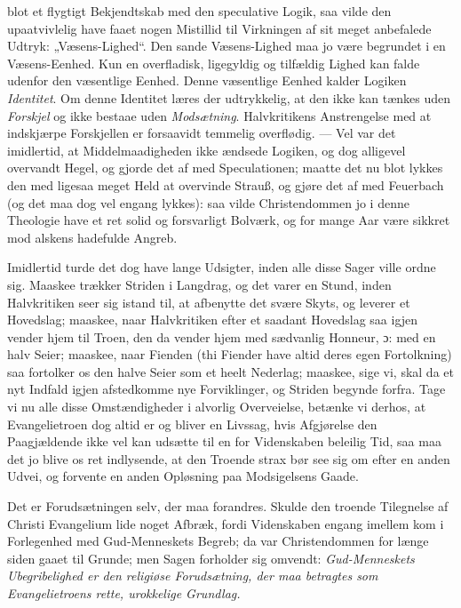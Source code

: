 \documentclass[12pt,a4paper]{book}
\begin{document}
blot et flygtigt Bekjendtskab med den speculative Logik, saa vilde den upaatvivlelig
have faaet nogen Mistillid til Virkningen af sit meget anbefalede Udtryk:
„Væsens-Lighed“. Den sande Væsens-Lighed maa jo være begrundet i en Væsens-Eenhed. Kun
en overfladisk, ligegyldig og tilfældig Lighed kan falde udenfor den væsentlige
Eenhed. Denne væsentlige Eenhed kalder Logiken \emph{Identitet}. Om denne Identitet
læres der udtrykkelig, at den ikke kan tænkes uden \emph{Forskjel} og ikke bestaae
uden \emph{Modsætning}. Halvkritikens Anstrengelse med at indskjærpe Forskjellen er
forsaavidt temmelig overflødig. --- Vel var det imidlertid, at Middelmaadigheden ikke
ændsede Logiken, og dog alligevel overvandt Hegel, og gjorde det af med Speculationen;
maatte det nu blot lykkes den med ligesaa meget Held at overvinde Strauß, og gjøre det
af med Feuerbach (og det maa dog vel engang lykkes): saa vilde Christendommen jo i
denne Theologie have et ret solid og forsvarligt Bolværk, og for mange Aar være sikkret
mod alskens hadefulde Angreb.

Imidlertid turde det dog have lange Udsigter, inden alle disse Sager ville ordne sig.
Maaskee trækker Striden i Langdrag, og det varer en Stund, inden Halvkritiken seer sig
istand til, at afbenytte det svære Skyts, og leverer et Hovedslag; maaskee, naar
Halvkritiken efter et saadant Hovedslag saa igjen vender hjem til Troen, den da vender
hjem med sædvanlig Honneur, ɔ: med en halv Seier; maaskee, naar Fienden (thi Fiender
have altid deres egen Fortolkning) saa fortolker os den halve Seier som et heelt
Nederlag; maaskee, sige vi, skal da et nyt Indfald igjen afstedkomme nye Forviklinger,
og Striden begynde forfra. Tage vi nu alle disse Omstændigheder i alvorlig
Overveielse, betænke vi derhos, at Evangelietroen dog altid er og bliver en Livssag,
hvis Afgjørelse den Paagjældende ikke vel kan udsætte til en for Videnskaben beleilig
Tid, saa maa det jo blive os ret indlysende, at den Troende strax bør see sig om efter
en anden Udvei, og forvente en anden Opløsning paa Modsigelsens Gaade.

Det er Forudsætningen selv, der maa forandres. Skulde den troende Tilegnelse af Christi
Evangelium lide noget Afbræk, fordi Videnskaben engang imellem kom i Forlegenhed med
Gud-Menneskets Begreb; da var Christendommen for længe siden gaaet til Grunde; men
Sagen forholder sig omvendt: \emph{Gud-Menneskets Ubegribelighed er den religiøse
Forudsætning, der maa betragtes som Evangelietroens rette, urokkelige Grundlag.}
\end{document}
